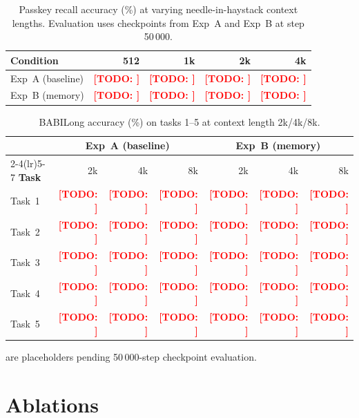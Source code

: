 \documentclass{article}
\providecommand{\todo}[1]{\textcolor{red}{\textbf{[TODO: #1]}}}
\begin{document}
\begin{table}[h]
  \centering
  \small
  \caption{Passkey recall accuracy (\%) at varying needle-in-haystack context lengths.
    Evaluation uses checkpoints from Exp~A and Exp~B at step 50\,000.}
  \label{tab:passkey}
  \begin{tabular}{lrrrr}
    \toprule
    \textbf{Condition} & \textbf{512} & \textbf{1k} & \textbf{2k} & \textbf{4k} \\
    \midrule
    Exp~A (baseline) & \todo{} & \todo{} & \todo{} & \todo{} \\
    Exp~B (memory)   & \todo{} & \todo{} & \todo{} & \todo{} \\
    \bottomrule
  \end{tabular}
\end{table}

\begin{table}[h]
  \centering
  \small
  \caption{BABILong accuracy (\%) on tasks 1--5 at context length 2k/4k/8k.}
  \label{tab:babilong}
  \begin{tabular}{lrrrrrr}
    \toprule
    & \multicolumn{3}{c}{\textbf{Exp~A (baseline)}} &
      \multicolumn{3}{c}{\textbf{Exp~B (memory)}} \\
    \cmidrule(lr){2-4}\cmidrule(lr){5-7}
    \textbf{Task} & 2k & 4k & 8k & 2k & 4k & 8k \\
    \midrule
    Task~1 & \todo{} & \todo{} & \todo{} & \todo{} & \todo{} & \todo{} \\
    Task~2 & \todo{} & \todo{} & \todo{} & \todo{} & \todo{} & \todo{} \\
    Task~3 & \todo{} & \todo{} & \todo{} & \todo{} & \todo{} & \todo{} \\
    Task~4 & \todo{} & \todo{} & \todo{} & \todo{} & \todo{} & \todo{} \\
    Task~5 & \todo{} & \todo{} & \todo{} & \todo{} & \todo{} & \todo{} \\
    \bottomrule
  \end{tabular}
\end{table}

 are placeholders pending 50\,000-step checkpoint
evaluation.

\section{Ablations}
\label{sec:ablations}
\end{document}
